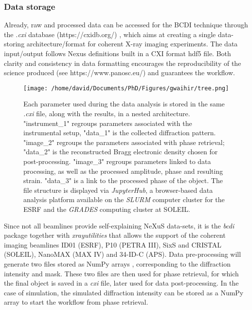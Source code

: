 \subsubsection{Data storage}

Already, raw and processed data can be accessed for the BCDI technique through the \textit{.cxi} database (https://cxidb.org/) \parencite{Maia2012}, which aims at creating a single data-storing architecture/format for coherent X-ray imaging experiments.
The data input/output follows Nexus definitions \parencite{Konnecke2015} built in a CXI format hdf5 file.
Both clarity and consistency in data formatting encourages the reproducibility of the science produced (see https://www.panosc.eu/) and guarantees the workflow.

\begin{figure}[!htb]
    \centering
    \texttt{[image: /home/david/Documents/PhD/Figures/gwaihir/tree.png]}
    \caption{
    Each parameter used during the data analysis is stored in the same \textit{.cxi} file, along with the results, in a  nested architecture.
    "instrument\_1" regroups parameters associated with the instrumental setup, "data\_1" is the collected diffraction pattern.
    "image\_2" regroups the parameters associated with phase retrieval; "data\_2" is the reconstructed Bragg electronic density chosen for post-processing.
    "image\_3" regroups parameters linked to data processing, as well as the processed amplitude, phase and resulting strain. "data\_3" is a link to the processed phase of the object.
    The file structure is displayed via \textit{JupyterHub}, a browser-based data analysis platform available on the \textit{SLURM} computer cluster for the ESRF and the \textit{GRADES} computing cluster at SOLEIL.
    }
    \label{fig:TREE}
\end{figure}

Since not all beamlines provide self-explaining NeXuS data-sets, it is the \textit{bcdi} package together with \textit{xrayutilities} \cite{kriegner_xrayutilities_2013} that allows the support of the coherent imaging beamlines ID01 (ESRF), P10 (PETRA III), SixS and CRISTAL (SOLEIL), NanoMAX (MAX IV) and 34-ID-C (APS).
Data pre-processing will generate two files stored as NumPy arrays \cite{NumPy}, corresponding to the diffraction intensity and mask.
These two files are then used for phase retrieval, for which the final object is saved in a \textit{cxi} file, later used for data post-processing.
In the case of simulation, the simulated diffraction intensity can be stored as a NumPy array to start the workflow from phase retrieval.

